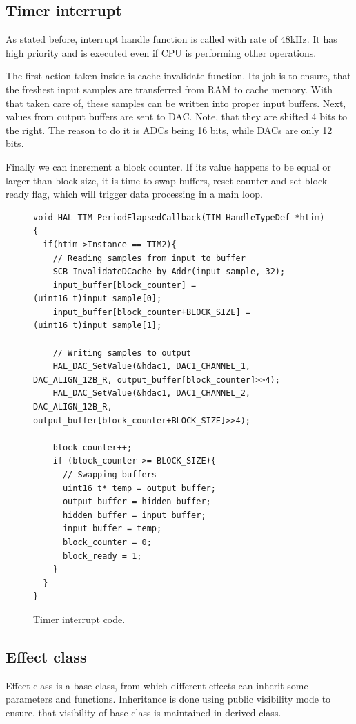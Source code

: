\documentclass[a4paper,twoside,12pt]{book}
\begin{document}
\subsection{Timer interrupt}
As stated before, interrupt handle function is called with rate of 48kHz.
It has high priority and
is executed even if CPU is performing other operations.

The first action taken inside is cache invalidate function.
Its job is to ensure, that the freshest input samples
are transferred from RAM to cache memory.
With that taken care of, these samples can be written into
proper input buffers.
Next, values from output buffers are sent to DAC.
Note, that they are shifted 4 bits to the right.
The reason to do it is ADCs being 16 bits, while DACs are only 12 bits.

Finally we can increment a block counter.
If its value happens to be equal or larger than block size,
it is time to swap buffers, reset counter and set block ready flag,
which will trigger data processing in a main loop.

\begin{figure}[H]
\centering
\begin{lstlisting}
void HAL_TIM_PeriodElapsedCallback(TIM_HandleTypeDef *htim){
  if(htim->Instance == TIM2){
    // Reading samples from input to buffer
    SCB_InvalidateDCache_by_Addr(input_sample, 32);
    input_buffer[block_counter] = (uint16_t)input_sample[0];
    input_buffer[block_counter+BLOCK_SIZE] = (uint16_t)input_sample[1];

    // Writing samples to output
    HAL_DAC_SetValue(&hdac1, DAC1_CHANNEL_1, DAC_ALIGN_12B_R, output_buffer[block_counter]>>4);
    HAL_DAC_SetValue(&hdac1, DAC1_CHANNEL_2, DAC_ALIGN_12B_R, output_buffer[block_counter+BLOCK_SIZE]>>4);

    block_counter++;
    if (block_counter >= BLOCK_SIZE){
      // Swapping buffers
      uint16_t* temp = output_buffer;
      output_buffer = hidden_buffer;
      hidden_buffer = input_buffer;
      input_buffer = temp;
      block_counter = 0;
      block_ready = 1;
    }
  }
}
\end{lstlisting}
\caption{Timer interrupt code.}
\label{fig:timer}
\end{figure}

\subsection{Effect class}
Effect class is a base class, from which different effects can inherit
some parameters and functions.
Inheritance is done using public visibility mode to ensure,
that visibility of base class is maintained in derived class.
\end{document}
